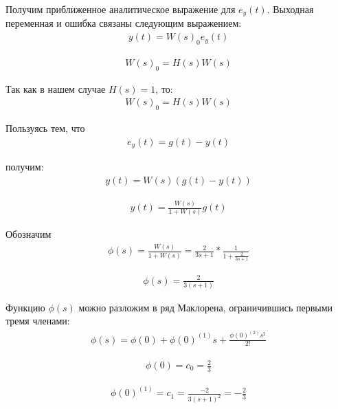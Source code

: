 \documentclass[a4paper, 11pt]{article}
\begin{document}
\par 
Получим приближенное аналитическое выражение для $e_y(t)$. Выходная переменная и ошибка связаны следующим выражением:
\begin{align}
\displaystyle y(t)= W(s)_0e_y(t)
\end{align}

\begin{align}
\displaystyle W(s)_0=H(s)W(s)
\end{align}

\par 
Так как в нашем случае $H(s) = 1$, то:
\begin{align}
\displaystyle W(s)_0=H(s)W(s)
\end{align} 

\par 
Пользуясь тем, что 
\begin{align}
\displaystyle e_y(t)=g(t)-y(t)
\end{align}

\par 
получим:
\begin{align}
\displaystyle y(t)=W(s)(g(t)-y(t))
\end{align} 

\begin{align}
y(t)=\displaystyle\frac{W(s)}{1+W(s)}g(t)
\end{align} 

\par 
Обозначим
\begin{align}
\phi(s)=\displaystyle\frac{W(s)}{1+W(s)}=\frac{2}{3s+1}*\frac{1}{1+\frac{2}{3s+1}}
\end{align} 

\begin{align}
\phi(s)=\displaystyle\frac{2}{3(s+1)}
\end{align}

\par 
	Функцию $\phi(s)$ можно разложим в ряд Маклорена, ограничившись первыми тремя членами:
\begin{align}
\displaystyle \phi(s)=\phi(0)+\phi(0)^{(1)}s+\frac{\phi(0)^{(2)}s^2}{2!}
\end{align}

\begin{align}
\displaystyle \phi(0)=c_0=\frac{2}{3}
\end{align} 

\begin{align}
\phi(0)^{(1)}=c_1=\displaystyle\frac{-2}{3(s+1)^2}=-\frac{2}{3}
\end{align} 
\end{document}
